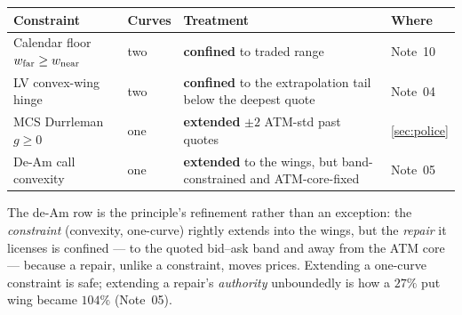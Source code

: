 \documentclass[11pt]{article}
\begin{document}
\begin{center}
\small
\begin{tabular}{p{}p{}p{}p{}}
\toprule
Constraint & Curves & Treatment & Where\\
\midrule
Calendar floor $w_{\mathrm{far}}\ge w_{\mathrm{near}}$ & two &
\textbf{confined} to traded range & Note~10\\
LV convex-wing hinge & two\footnotemark & \textbf{confined} to the
extrapolation tail below the deepest quote & Note~04\\
MCS Durrleman $g\ge0$ & one & \textbf{extended} $\pm2$ ATM-std past
quotes & \cref{sec:police}\\
De-Am call convexity & one & \textbf{extended} to the wings, but
band-constrained and ATM-core-fixed & Note~05\\
\bottomrule
\end{tabular}
\end{center}

The de-Am row is the principle's refinement rather than an exception:
the \emph{constraint} (convexity, one-curve) rightly extends into the
wings, but the \emph{repair} it licenses is confined --- to the quoted
bid--ask band and away from the ATM core --- because a repair, unlike a
constraint, moves prices.  Extending a one-curve constraint is safe;
extending a repair's \emph{authority} unboundedly is how a $27\%$ put
wing became $104\%$ (Note~05).
\end{document}
